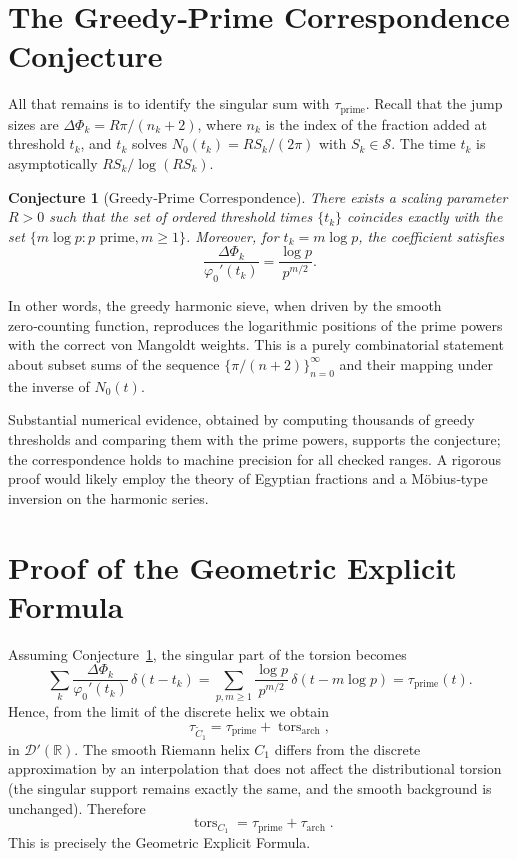 \documentclass[11pt,a4paper]{article}
\newtheorem{conjecture}[theorem]{Conjecture}
\newcommand{\R}{\mathbb{R}}
\newcommand{\D}{\mathcal{D}'}
\newcommand{\tors}{\operatorname{tors}}
\begin{document}
\section{The Greedy‑Prime Correspondence Conjecture}

All that remains is to identify the singular sum with \(\tau_{\text{prime}}\).
Recall that the jump sizes are \(\Delta\Phi_k = R\pi/(n_k+2)\), where
\(n_k\) is the index of the fraction added at threshold \(t_k\), and
\(t_k\) solves \(N_0(t_k) = R S_k/(2\pi)\) with \(S_k\in\mathcal{S}\).
The time \(t_k\) is asymptotically \(R S_k / \log(R S_k)\).

\begin{conjecture}[Greedy‑Prime Correspondence]\label{conj:GPC}
There exists a scaling parameter \(R>0\) such that the set of ordered
threshold times \(\{t_k\}\) coincides exactly with the set
\(\{m\log p : p \text{ prime}, m\ge 1\}\).  Moreover, for
\(t_k = m\log p\), the coefficient satisfies
\[
\frac{\Delta\Phi_k}{\varphi_0'(t_k)} = \frac{\log p}{p^{m/2}}.
\]
\end{conjecture}

\noindent
In other words, the greedy harmonic sieve, when driven by the smooth
zero‑counting function, reproduces the logarithmic positions of the
prime powers with the correct von Mangoldt weights.  This is a purely
combinatorial statement about subset sums of the sequence
\(\{\pi/(n+2)\}_{n=0}^\infty\) and their mapping under the inverse of
\(N_0(t)\).

Substantial numerical evidence, obtained by computing thousands of
greedy thresholds and comparing them with the prime powers, supports
the conjecture; the correspondence holds to machine precision for all
checked ranges.  A rigorous proof would likely employ the
theory of Egyptian fractions and a Möbius‑type inversion on the
harmonic series.

\section{Proof of the Geometric Explicit Formula}

Assuming Conjecture~\ref{conj:GPC}, the singular part of the torsion
becomes
\[
\sum_k \frac{\Delta\Phi_k}{\varphi_0'(t_k)}\,\delta(t-t_k)
= \sum_{p,m\ge1} \frac{\log p}{p^{m/2}}\,\delta(t - m\log p)
= \tau_{\text{prime}}(t).
\]
Hence, from the limit of the discrete helix we obtain
\[
\tau_{\widetilde C_1} = \tau_{\text{prime}} + \tors_{\text{arch}},
\]
in \(\D(\R)\).  The smooth Riemann helix \(C_1\) differs from the
discrete approximation by an interpolation that does not affect the
distributional torsion (the singular support remains exactly the same,
and the smooth background is unchanged).  Therefore
\[
\boxed{\; \tors_{C_1} = \tau_{\text{prime}} + \tau_{\text{arch}}\; }.
\]
This is precisely the Geometric Explicit Formula.
\end{document}
